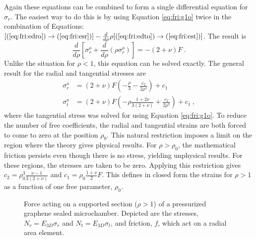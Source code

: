 Again these equations can be combined to form a single differential equation for $\sigma_r$.
The easiest way to do this is by using Equation \ref{eq:fri:g1o} twice in the combination of Equations: $[(\ref{eq:fri:edro}) \rightarrow (\ref{eq:fri:esr})]-\frac{d}{d \rho}\rho[(\ref{eq:fri:edto})\rightarrow(\ref{eq:fri:est})]$.
The result is
\begin{equation}
	\frac{d}{d\rho}[\sigma_r^o+\frac{d}{d\rho}(\rho \sigma_r^o)]=-(2+\nu) F \ .
	\label{eq:fri:comboout}
\end{equation}
Unlike the situation for $\rho<1$, this equation can be solved exactly.
The general result for the radial and tangential stresses are
\begin{align}
	\sigma_r^o&=(2+\nu)F(-\frac{\rho}{3}-\frac{c_2}{2 \rho^2})+c_1 \\
	\sigma_t^o&=(2+\nu)F(-\rho \frac{1+2 \nu}{3(2+\nu)}+\frac{c_2}{2 \rho^2})+c_1 \ ,
\end{align}
where the tangential stress was solved for using Equation \ref{eq:fri:g1o}.
To reduce the number of free coefficients, the radial and tangential strains are both forced to come to zero at the position $\rho_0$.
This natural restriction imposes a limit on the region where the theory gives physical results.
For $\rho>\rho_0$, the mathematical friction persists even though there is no stress, yielding unphysical results.
For these regions, the stresses are taken to be zero.
Applying this restriction gives $c_2=\rho_0^3 \frac{\nu-1}{3(2+\nu)}$ and $c_1=\rho_0 \frac{1+\nu}{2} F$.
This defines in closed form the strains for $\rho>1$ as a function of one free parameter, $\rho_0$.

\begin{figure}
	\begin{center}
	
	\end{center}
	\caption[Forces acting on supported, pressurized graphene]{\label{fig:fri:stressfigureo}
	Force acting on a supported section ($\rho>1$) of a pressurized graphene sealed microchamber.
	Depicted are the stresses, $N_r=E_{3D} \sigma_r$ and $N_t=E_{3D} \sigma_t$, and friction, $f$, which act on a radial area element.
	}
\end{figure}

